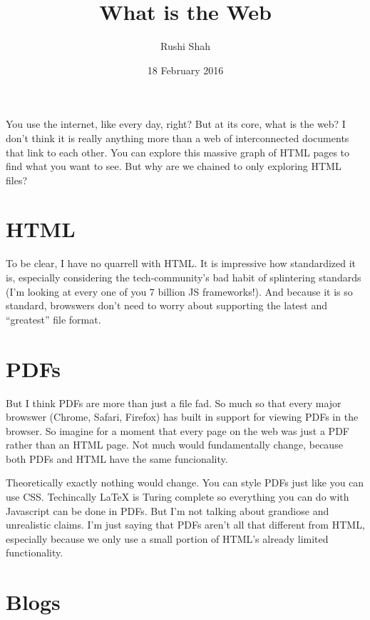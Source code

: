 \documentclass[12pt]{article}
\title{What is the Web}
\author{Rushi Shah}
\date{18 February 2016}
\begin{document}
  \maketitle



  You use the internet, like every day, right? But at its core, what is the web? I don't think it is really anything more than a web of interconnected documents that link to each other. You can explore this massive graph of HTML pages to find what you want to see. But why are we chained to only exploring HTML files?

  \section{HTML}

  To be clear, I have no quarrell with HTML. It is impressive how standardized it is, especially considering the tech-community's bad habit of splintering standards (I'm looking at every one of you 7 billion JS frameworks!). And because it is so standard, browswers don't need to worry about supporting the latest and ``greatest'' file format.

  \section{PDFs}

  But I think PDFs are more than just a file fad. So much so that every major browswer (Chrome, Safari, Firefox) has built in support for viewing PDFs in the browser. So imagine for a moment that every page on the web was just a PDF rather than an HTML page. Not much would fundamentally change, because both PDFs and HTML have the same funcionality. 

  Theoretically exactly nothing would change. You can style PDFs just like you can use CSS. Techincally LaTeX is Turing complete so everything you can do with Javascript can be done in PDFs. But I'm not talking about grandiose and unrealistic claims. I'm just saying that PDFs aren't all that different from HTML, especially because we only use a small portion of HTML's already limited functionality. 

  \section{Blogs}
\end{document}
